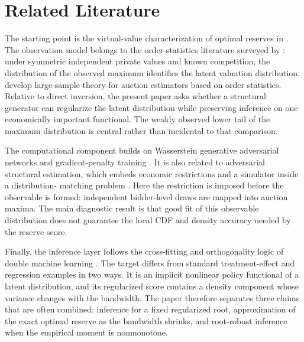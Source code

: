 \section{Related Literature}

The starting point is the virtual-value characterization of optimal reserves
in \citet{myerson1981}. The observation model belongs to the order-statistics
literature surveyed by \citet{atheyhaile2007}: under symmetric independent
private values and known competition, the distribution of the observed maximum
identifies the latent valuation distribution. \citet{menzelmorganti2013}
develop large-sample theory for auction estimators based on order statistics.
Relative to direct inversion, the present paper asks whether a structural
generator can regularize the latent distribution while preserving inference
on one economically important functional. The weakly observed lower tail of
the maximum distribution is central rather than incidental to that comparison.

The computational component builds on Wasserstein generative adversarial
networks \citep{arjovsky2017} and gradient-penalty training
\citep{gulrajani2017}. It is also related to adversarial structural estimation,
which embeds economic restrictions and a simulator inside a distribution-
matching problem \citep{kaji2026}. Here the restriction is imposed before the
observable is formed: independent bidder-level draws are mapped into auction
maxima. The main diagnostic result is that good fit of this observable
distribution does not guarantee the local CDF and density accuracy needed by
the reserve score.

Finally, the inference layer follows the cross-fitting and orthogonality logic
of double machine learning \citep{chernozhukov2018}. The target differs
from standard treatment-effect and regression examples in two ways. It is an
implicit nonlinear policy functional of a latent distribution, and its
regularized score contains a density component whose variance changes with the
bandwidth. The paper therefore separates three claims that are often combined:
inference for a fixed regularized root, approximation of the exact optimal
reserve as the bandwidth shrinks, and root-robust inference when the empirical
moment is nonmonotone.
